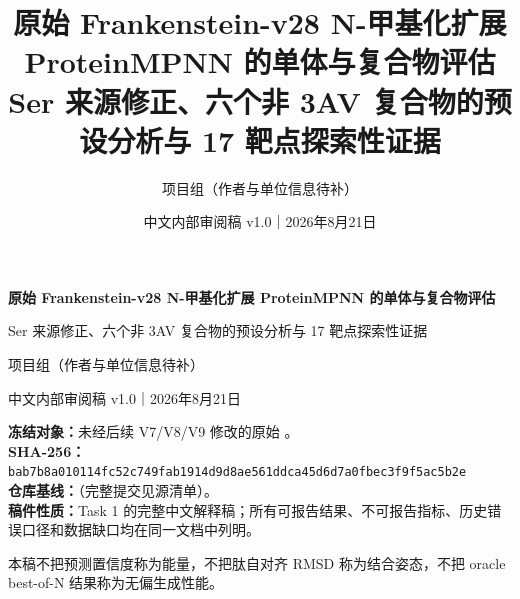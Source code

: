\documentclass[11pt,a4paper]{article}
\title{\bfseries\LARGE 原始 Frankenstein-v28 N-甲基化扩展 ProteinMPNN 的单体与复合物评估\\[0.45em]
\large Ser 来源修正、六个非 3AV 复合物的预设分析与 17 靶点探索性证据}
\author{项目组（作者与单位信息待补）}
\date{中文内部审阅稿 v1.0｜2026年8月21日}
\newcommand{\checkpointsha}{\texttt{bab7b8a0\allowbreak{}10114fc5\allowbreak{}2c749fab\allowbreak{}1914d9d8\allowbreak{}ae561ddc\allowbreak{}a45d6d7a\allowbreak{}0fbec3f9\allowbreak{}f5ac5b2e}}
\begin{document}
\begin{titlepage}
  \centering
  \vspace*{22mm}
  {\color{DeepBlue}\bfseries\LARGE 原始 Frankenstein-v28 N-甲基化扩展 ProteinMPNN 的单体与复合物评估\par}
  \vspace{4mm}
  {\Large Ser 来源修正、六个非 3AV 复合物的预设分析与 17 靶点探索性证据\par}
  \vspace{12mm}
  {\large 项目组（作者与单位信息待补）\par}
  \vspace{3mm}
  {\large 中文内部审阅稿 v1.0｜2026年8月21日\par}
  \vfill
  \begin{tcolorbox}[width=0.92\textwidth,colback=SoftBlue,colframe=DeepBlue,boxrule=0.8pt,arc=2mm]
    \textbf{冻结对象：}未经后续 V7/V8/V9 修改的原始 。\\
    \textbf{SHA-256：}\checkpointsha\\
    \textbf{仓库基线：}（完整提交见源清单）。\\
    \textbf{稿件性质：}Task 1 的完整中文解释稿；所有可报告结果、不可报告指标、历史错误口径和数据缺口均在同一文档中列明。
  \end{tcolorbox}
  \vspace{6mm}
  {\small 本稿不把预测置信度称为能量，不把肽自对齐 RMSD 称为结合姿态，不把 oracle best-of-N 结果称为无偏生成性能。\par}
\end{titlepage}



\clearpage
\tableofcontents
\clearpage
\listoffigures
\listoftables
\clearpage









\clearpage
\appendix





\clearpage


\end{document}
